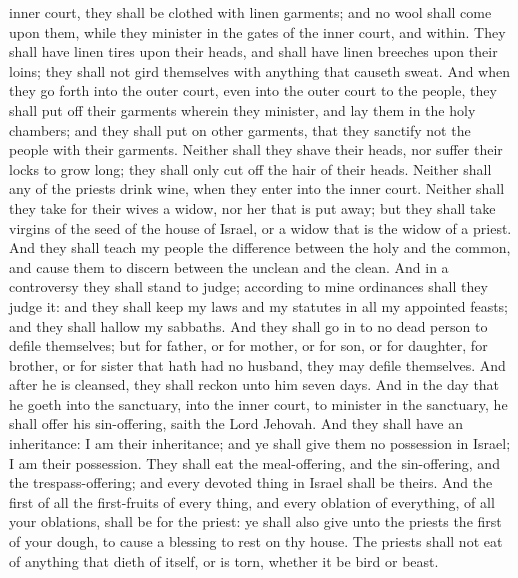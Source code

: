 inner court, they shall be clothed with linen garments; and no wool shall come upon them, while they minister in the gates of the inner court, and within. They shall have linen tires upon their heads, and shall have linen breeches upon their loins; they shall not gird themselves with anything that causeth sweat. And when they go forth into the outer court, even into the outer court to the people, they shall put off their garments wherein they minister, and lay them in the holy chambers; and they shall put on other garments, that they sanctify not the people with their garments. Neither shall they shave their heads, nor suffer their locks to grow long; they shall only cut off the hair of their heads. Neither shall any of the priests drink wine, when they enter into the inner court. Neither shall they take for their wives a widow, nor her that is put away; but they shall take virgins of the seed of the house of Israel, or a widow that is the widow of a priest. And they shall teach my people the difference between the holy and the common, and cause them to discern between the unclean and the clean. And in a controversy they shall stand to judge; according to mine ordinances shall they judge it: and they shall keep my laws and my statutes in all my appointed feasts; and they shall hallow my sabbaths. And they shall go in to no dead person to defile themselves; but for father, or for mother, or for son, or for daughter, for brother, or for sister that hath had no husband, they may defile themselves. And after he is cleansed, they shall reckon unto him seven days. And in the day that he goeth into the sanctuary, into the inner court, to minister in the sanctuary, he shall offer his sin-offering, saith the Lord Jehovah.  And they shall have an inheritance: I am their inheritance; and ye shall give them no possession in Israel; I am their possession. They shall eat the meal-offering, and the sin-offering, and the trespass-offering; and every devoted thing in Israel shall be theirs. And the first of all the first-fruits of every thing, and every oblation of everything, of all your oblations, shall be for the priest: ye shall also give unto the priests the first of your dough, to cause a blessing to rest on thy house. The priests shall not eat of anything that dieth of itself, or is torn, whether it be bird or beast. 

